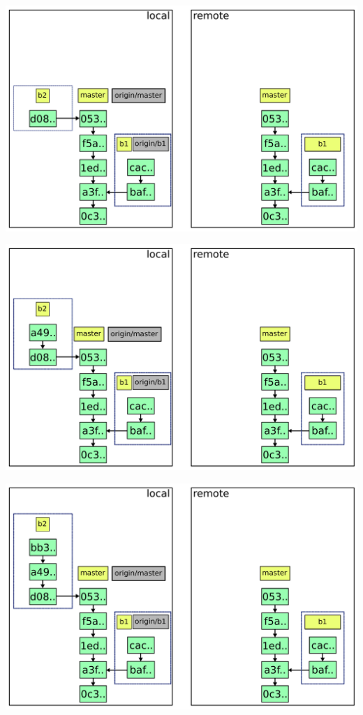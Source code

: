 \documentclass{beamer}
\begin{document}
\begin{frame}{}
  \includegraphics[width=\textwidth]{img/3-bis.pdf}
\end{frame}

\begin{frame}{}
  \includegraphics[width=\textwidth]{img/3-ter.pdf}
\end{frame}

\begin{frame}{}
  \includegraphics[width=\textwidth]{img/3-quad.pdf}
\end{frame}
\end{document}
